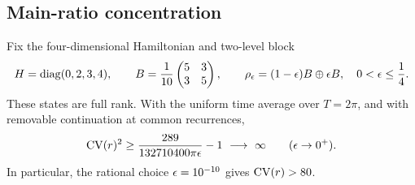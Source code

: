 \subsection{Main-ratio concentration}
\begin{theorem}\label{thm:main-ratio}
Fix the four-dimensional Hamiltonian and two-level block
\begin{equation}\label{eq:main-family}
 H=\operatorname{diag}(0,2,3,4),\qquad
 B=\frac1{10}\begin{pmatrix}5&3\\3&5\end{pmatrix},\qquad
 \rho_\epsilon=(1-\epsilon)B\oplus\epsilon B,
 \quad 0<\epsilon\le\frac14.
\end{equation}
These states are full rank. With the uniform time average over $T=2\pi$,
and with removable continuation at common recurrences,
\begin{equation}\label{eq:main-cv}
 \operatorname{CV}(r)^2\ge\frac{289}{132710400\pi\epsilon}-1
 \ \longrightarrow\ \infty\qquad(\epsilon\to0^+).
\end{equation}
In particular, the rational choice $\epsilon=10^{-10}$ gives $\operatorname{CV}(r)>80$.
\end{theorem}
